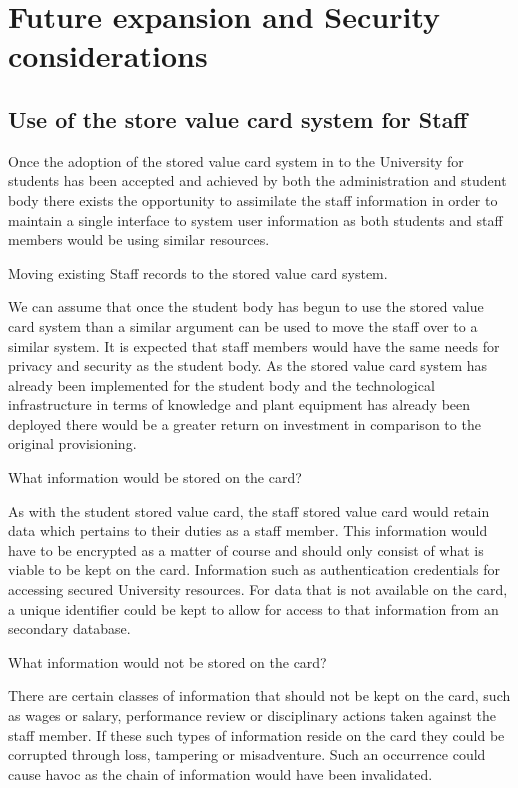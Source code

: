 \section{Future expansion and Security considerations}

\subsection{Use of the store value card system for Staff}

Once the adoption of the stored value card system in to the University for
students has been accepted and achieved by both the administration and student
body there exists the opportunity to assimilate the staff information in order
to maintain a single interface to system user information as both students and
staff members would be using similar resources.

\items Moving existing Staff records to the stored value card system.

We can assume that once the student body has begun to use the stored value card
system than a similar argument can be used to move the staff over to a similar
system. It is expected that staff members would have the same needs for privacy
and security as the student body. As the stored value card system has already
been implemented for the student body and the technological infrastructure in
terms of knowledge and plant equipment has already been deployed there would be
a greater return on investment in comparison to the original provisioning.

\items What information would be stored on the card?

As with the student stored value card, the staff stored value card would retain
data which pertains to their duties as a staff member. This information would
have to be encrypted as a matter of course and should only consist of what is
viable to be kept on the card. Information such as authentication credentials
for accessing secured University resources. For data that is not available on
the card, a unique identifier could be kept to allow for access to that
information from an secondary database.

\items What information would not be stored on the card?

There are certain classes of information that should not be kept on the card,
such as wages or salary, performance review or disciplinary actions taken
against the staff member. If these such types of information reside on the card
they could be corrupted through loss, tampering or misadventure. Such an
occurrence could cause havoc as the chain of information would have been
invalidated.

